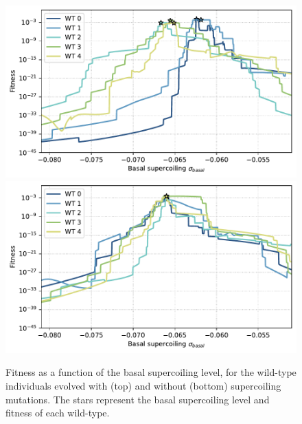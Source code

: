 \begin{figure}
\centering
\includegraphics[width=\textwidth]{epistasis/img/wt-with-sc/fitness_landscapes_wt.pdf}
\includegraphics[width=\textwidth]{epistasis/img/control/fitness_landscapes_wt.pdf}
\caption[Supercoiling fitness landscapes for the wild-type individuals evolved with and without supercoiling mutations]{Fitness as a function of the basal supercoiling level, for the wild-type individuals evolved with (top) and without (bottom) supercoiling mutations.
The stars represent the basal supercoiling level and fitness of each wild-type.}
\label{fig:epistasis:fitness-landscapes-wt}
\end{figure}

